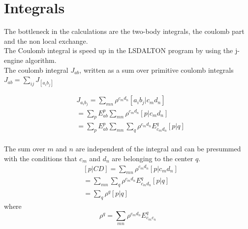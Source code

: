 \documentclass[12pt,a4paper,english]{beamer}
\begin{document}
\section{Integrals} \begin{frame} The bottleneck in the calculations are the
        two-body integrals, the coulomb part and the non local exchange. \\
        \vspace{\baselineskip}
        The Coulomb integral is speed up in the LSDALTON program by using the 
        j-engine algorithm. \\
        \vspace{\baselineskip}
        The coulomb integral $J_{ab}$, written as a sum over primitive coulomb integrals
        $J_{ab}=\sum_{ij}J_{[a_ib_j]}$
                
        \begin{equation}
        \begin{split}
                &J_{a_ib_j}=\sum_{mn}\rho^{c_md_n}[a_ib_j|c_md_n]\\
                &=\sum_{p}E^p_{ab}\sum_{mn}\rho^{c_md_n}[p|c_md_n]\\
                &=\sum_{p}E^p_{ab}\sum_{mn}\sum_q\rho^{c_md_n}E^q_{c_md_n}[p|q]\\
        \end{split}
        \end{equation}
\end{frame}
\begin{frame}
        The sum over $m$ and $n$ are independent of the integral and can be presummed with the conditions that $c_m$ and $d_n$ are belonging to the center $q$.
        \begin{equation}
                \begin{split}
                        &[p|CD]=\sum_{mn}\rho^{c_md_n}[p|c_md_n]\\
                        &=\sum_{mn}\sum_q\rho^{c_md_n}E^q_{c_md_n}[p|q]\\
                        &=\sum_q\rho^q[p|q]
                \end{split}
                \label{}
        \end{equation}
        where
        \begin{equation}
                \rho^q=\sum_{mn}\rho^{c_md_n}E^q_{c_mc_n}
                \label{}
        \end{equation}
\end{frame}
\end{document}

